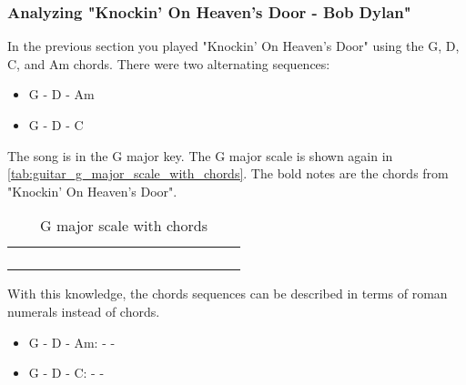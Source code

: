 \subsubsection{Analyzing "Knockin' On Heaven's Door - Bob Dylan"}

In the previous section you played "Knockin' On Heaven's Door" using the G, D, C, and Am chords. There were two alternating sequences:

\begin{itemize}
	\item G - D - Am
	\item G - D - C
\end{itemize}
 
The song is in the G major key. The G major scale is shown again in \autoref{tab:guitar_g_major_scale_with_chords}. The bold notes are the chords from "Knockin' On Heaven's Door".

\begin{table}[h]
	\centering
	\begin{NiceTabular}{*{16}{P{0.05mm}}}
		\Block{}{} &  & &  & &  & &  & &  & &  & &  & & \Block{}{} \\
		 & &  & &  & &  & &  & &  & &  & &  & \\
		 & &  & &  & &  & &  & &  & &  & & \\
		 & &  & &  & &  & &  & &  & &  & &  &
	\end{NiceTabular}
	\caption{G major scale with chords}
	\label{tab:guitar_g_major_scale_with_chords}
\end{table}

With this knowledge, the chords sequences can be described in terms of roman numerals instead of chords. 

\begin{itemize}
	\item G - D - Am:  -  - 
	\item G - D - C:  -  -  
\end{itemize}

